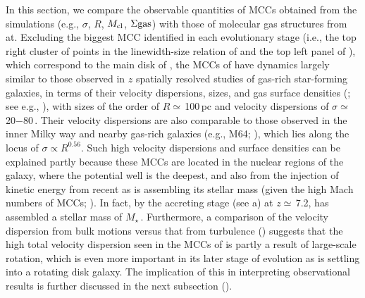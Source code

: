 \IfFileExists{emulateapjlegacy.cls}{\documentclass[iop]{emulateapjlegacy}}{\documentclass[iop]{emulateapj}}
\begin{document}
In this section, we compare the observable quantities of MCCs obtained from the simulations (e.g., $\sigma$, $R$, $M_{\rm cl}$, 
$\Sigma{\rm gas}$) with those of molecular gas structures from \obs at.
Excluding the biggest MCC identified in each evolutionary stage (i.e., the top right cluster of points in the 
linewidth-size relation of  and the top left panel of ), which correspond to 
the main disk of \flower, the MCCs of \flower have dynamics largely similar to those observed in
$z$ spatially resolved studies of gas-rich star-forming
galaxies, in terms of their velocity dispersions, sizes, and gas
surface densities (; see e.g.,
\citealt{Swinbank11a}), with sizes of the order of $R\simeq$\,100\,pc
and velocity dispersions of $\sigma\simeq$\,20$-$80\,\kms. 
Their velocity dispersions are also comparable to those observed in the inner 
Milky way and nearby gas-rich galaxies (e.g., M64; \citealt{Oka01a, Rosolowsky05a, Heyer09a}), which lies along the 
locus of $\sigma\propto R^{0.56}$. 
Such high velocity dispersions and surface densities can be explained partly because 
these MCCs are located in the nuclear regions of the galaxy, where the potential well is the deepest, 
and also from the injection of kinetic energy from recent
\SF as \flower is assembling its stellar mass (given the high Mach numbers of MCCs; ).
In fact, by the accreting stage (see a) at $z\simeq$\,7.2, 
\flower has assembled a stellar mass of
$M_\star$\,\Msun. 
Furthermore, a comparison of the velocity dispersion from bulk motions versus that from turbulence () suggests that 
the high total velocity dispersion seen in the MCCs of \flower is partly a result of large-scale rotation, which is even more important in 
its later stage of evolution as \flower is settling into a rotating disk galaxy. The implication of this in 
interpreting observational results is further discussed in the next subsection ().
\end{document}
